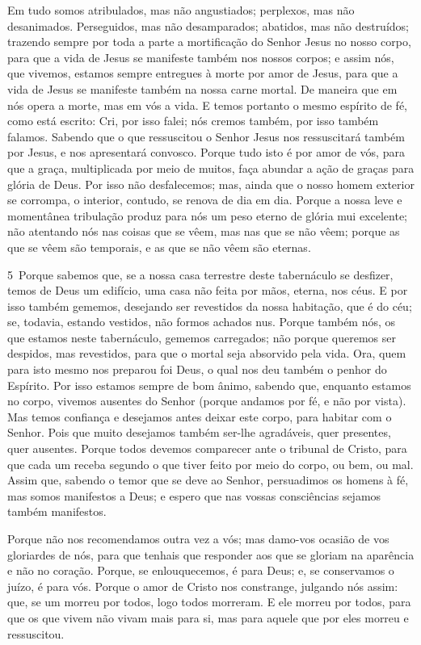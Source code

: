 Em tudo somos atribulados, mas não angustiados; perplexos, mas não
desanimados. Perseguidos, mas não desamparados; abatidos, mas
não destruídos; trazendo sempre por toda a parte a
mortificação do Senhor Jesus no nosso corpo, para que a vida de
Jesus se manifeste também nos nossos corpos; e assim nós, que
vivemos, estamos sempre entregues à morte por amor de Jesus, para
que a vida de Jesus se manifeste também na nossa carne mortal.
De maneira que em nós opera a morte, mas em vós a vida.
E temos portanto o mesmo espírito de fé, como está escrito:
Cri, por isso falei; nós cremos também, por isso também falamos.
Sabendo que o que ressuscitou o Senhor Jesus nos ressuscitará
também por Jesus, e nos apresentará convosco. Porque tudo
isto é por amor de vós, para que a graça, multiplicada por meio de
muitos, faça abundar a ação de graças para glória de Deus.
Por isso não desfalecemos; mas, ainda que o nosso homem
exterior se corrompa, o interior, contudo, se renova de dia em dia.
Porque a nossa leve e momentânea tribulação produz para nós
um peso eterno de glória mui excelente; não atentando nós nas
coisas que se vêem, mas nas que se não vêem; porque as que se vêem
são temporais, e as que se não vêem são eternas.

\medskip

\lettrine{5}\ Porque sabemos que, se a nossa casa terrestre
deste tabernáculo se desfizer, temos de Deus um edifício, uma casa
não feita por mãos, eterna, nos céus. E por isso também gememos,
desejando ser revestidos da nossa habitação, que é do céu; se,
todavia, estando vestidos, não formos achados nus. Porque também
nós, os que estamos neste tabernáculo, gememos carregados; não
porque queremos ser despidos, mas revestidos, para que o mortal seja
absorvido pela vida. Ora, quem para isto mesmo nos preparou foi
Deus, o qual nos deu também o penhor do Espírito. Por isso
estamos sempre de bom ânimo, sabendo que, enquanto estamos no corpo,
vivemos ausentes do Senhor (porque andamos por fé, e não por
vista). Mas temos confiança e desejamos antes deixar este corpo,
para habitar com o Senhor. Pois que muito desejamos também
ser-lhe agradáveis, quer presentes, quer ausentes. Porque
todos devemos comparecer ante o tribunal de Cristo, para que cada um
receba segundo o que tiver feito por meio do corpo, ou bem, ou mal.
Assim que, sabendo o temor que se deve ao Senhor, persuadimos
os homens à fé, mas somos manifestos a Deus; e espero que nas vossas
consciências sejamos também manifestos.

Porque não nos recomendamos outra vez a vós; mas damo-vos ocasião
de vos gloriardes de nós, para que tenhais que responder aos que se
gloriam na aparência e não no coração. Porque, se
enlouquecemos, é para Deus; e, se conservamos o juízo, é para vós.
Porque o amor de Cristo nos constrange, julgando nós assim:
que, se um morreu por todos, logo todos morreram. E ele
morreu por todos, para que os que vivem não vivam mais para si, mas
para aquele que por eles morreu e ressuscitou.


